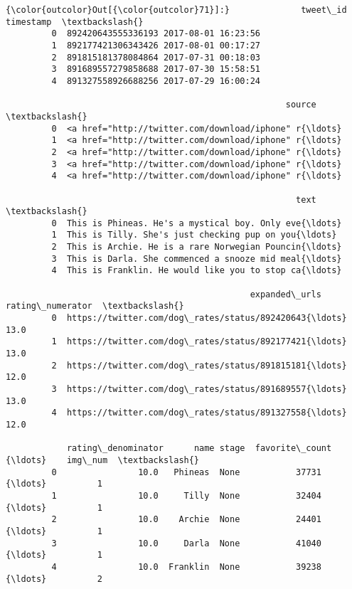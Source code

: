 \documentclass[11pt]{article}
\begin{document}
\begin{Verbatim}[commandchars=\\\{\}]
{\color{outcolor}Out[{\color{outcolor}71}]:}              tweet\_id           timestamp  \textbackslash{}
         0  892420643555336193 2017-08-01 16:23:56   
         1  892177421306343426 2017-08-01 00:17:27   
         2  891815181378084864 2017-07-31 00:18:03   
         3  891689557279858688 2017-07-30 15:58:51   
         4  891327558926688256 2017-07-29 16:00:24   
         
                                                       source  \textbackslash{}
         0  <a href="http://twitter.com/download/iphone" r{\ldots}   
         1  <a href="http://twitter.com/download/iphone" r{\ldots}   
         2  <a href="http://twitter.com/download/iphone" r{\ldots}   
         3  <a href="http://twitter.com/download/iphone" r{\ldots}   
         4  <a href="http://twitter.com/download/iphone" r{\ldots}   
         
                                                         text  \textbackslash{}
         0  This is Phineas. He's a mystical boy. Only eve{\ldots}   
         1  This is Tilly. She's just checking pup on you{\ldots}   
         2  This is Archie. He is a rare Norwegian Pouncin{\ldots}   
         3  This is Darla. She commenced a snooze mid meal{\ldots}   
         4  This is Franklin. He would like you to stop ca{\ldots}   
         
                                                expanded\_urls  rating\_numerator  \textbackslash{}
         0  https://twitter.com/dog\_rates/status/892420643{\ldots}              13.0   
         1  https://twitter.com/dog\_rates/status/892177421{\ldots}              13.0   
         2  https://twitter.com/dog\_rates/status/891815181{\ldots}              12.0   
         3  https://twitter.com/dog\_rates/status/891689557{\ldots}              13.0   
         4  https://twitter.com/dog\_rates/status/891327558{\ldots}              12.0   
         
            rating\_denominator      name stage  favorite\_count  {\ldots}    img\_num  \textbackslash{}
         0                10.0   Phineas  None           37731  {\ldots}          1   
         1                10.0     Tilly  None           32404  {\ldots}          1   
         2                10.0    Archie  None           24401  {\ldots}          1   
         3                10.0     Darla  None           41040  {\ldots}          1   
         4                10.0  Franklin  None           39238  {\ldots}          2   
         

\end{Verbatim}
\end{document}
